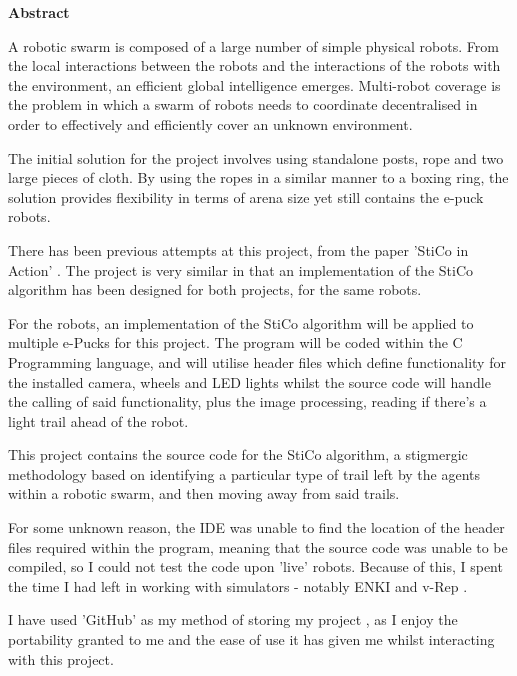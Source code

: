\thispagestyle{plain}
\begin{center}
    \textbf{Abstract}
\end{center} \label{dissAbstract}
A robotic swarm is composed of a large number of simple physical robots. From
the local interactions between the robots and the interactions of the robots
with the environment, an efficient global intelligence emerges. Multi-robot
coverage is the problem in which a swarm of robots needs to coordinate
decentralised in order to effectively and efficiently cover an unknown
environment.

The initial solution for the project involves using standalone posts, rope and
two large pieces of cloth.  By using the ropes in a similar manner to a boxing
ring, the solution provides flexibility in terms of arena size yet still 
contains the e-puck robots.

There has been previous attempts at this project, from the paper 'StiCo in
Action' \cite{Ranjbar-Sahraei2013Demo}.  The project is very similar in
that an implementation of the StiCo algorithm has been designed for both
projects, for the same robots.

For the robots, an implementation of the StiCo algorithm will be applied to
multiple e-Pucks for this project.  The program will be coded within the C
Programming language, and will utilise header files which define functionality
for the installed camera, wheels and LED lights whilst the source code will
handle the calling of said functionality, plus the image processing,
reading if there's a light trail ahead of the robot.

This project contains the source code for the StiCo algorithm, a stigmergic
methodology based on identifying a particular type of trail left by the agents
within a robotic swarm, and then moving away from said trails.

For some unknown reason, the IDE was unable to find the location of the header
files required within the program, meaning that the source code was unable to
be compiled, so I could not test the code upon 'live' robots.  Because of this,
I spent the time I had left in working with simulators - notably ENKI and
v-Rep \cite{enkiSite,vRepSite}.

I have used 'GitHub' as my method of storing my project \cite{GithubRepo}, as I
enjoy the portability granted to me and the ease of use it has given me whilst
interacting with this project.